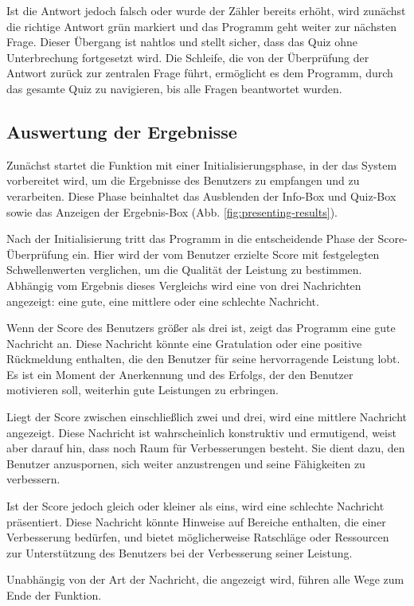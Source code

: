 \documentclass[10pt, fleqn]{scrartcl}
\begin{document}
Ist die Antwort jedoch falsch oder wurde der Zähler bereits erhöht, wird zunächst die richtige Antwort grün markiert und das Programm geht weiter zur nächsten Frage. Dieser Übergang ist nahtlos und stellt sicher, dass das Quiz ohne Unterbrechung fortgesetzt wird. Die Schleife, die von der Überprüfung der Antwort zurück zur zentralen Frage führt, ermöglicht es dem Programm, durch das gesamte Quiz zu navigieren, bis alle Fragen beantwortet wurden.

\subsection{Auswertung der Ergebnisse}

Zunächst startet die Funktion mit einer Initialisierungsphase, in der das System vorbereitet wird, um die Ergebnisse des Benutzers zu empfangen und zu verarbeiten. Diese Phase beinhaltet das Ausblenden der Info-Box und Quiz-Box sowie das Anzeigen der Ergebnis-Box (Abb. \ref{fig:presenting-results}).

Nach der Initialisierung tritt das Programm in die entscheidende Phase der Score-Überprüfung ein. Hier wird der vom Benutzer erzielte Score mit festgelegten Schwellenwerten verglichen, um die Qualität der Leistung zu bestimmen. Abhängig vom Ergebnis dieses Vergleichs wird eine von drei Nachrichten angezeigt: eine gute, eine mittlere oder eine schlechte Nachricht.

Wenn der Score des Benutzers größer als drei ist, zeigt das Programm eine gute Nachricht an. Diese Nachricht könnte eine Gratulation oder eine positive Rückmeldung enthalten, die den Benutzer für seine hervorragende Leistung lobt. Es ist ein Moment der Anerkennung und des Erfolgs, der den Benutzer motivieren soll, weiterhin gute Leistungen zu erbringen.

Liegt der Score zwischen einschließlich zwei und drei, wird eine mittlere Nachricht angezeigt. Diese Nachricht ist wahrscheinlich konstruktiv und ermutigend, weist aber darauf hin, dass noch Raum für Verbesserungen besteht. Sie dient dazu, den Benutzer anzuspornen, sich weiter anzustrengen und seine Fähigkeiten zu verbessern.

Ist der Score jedoch gleich oder kleiner als eins, wird eine schlechte Nachricht präsentiert. Diese Nachricht könnte Hinweise auf Bereiche enthalten, die einer Verbesserung bedürfen, und bietet möglicherweise Ratschläge oder Ressourcen zur Unterstützung des Benutzers bei der Verbesserung seiner Leistung.

Unabhängig von der Art der Nachricht, die angezeigt wird, führen alle Wege zum Ende der Funktion.
\end{document}
